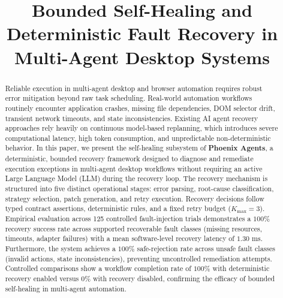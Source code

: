 \documentclass[conference]{IEEEtran}
\begin{document}
\title{Bounded Self-Healing and Deterministic Fault Recovery in Multi-Agent Desktop Systems}

\author{
}

\maketitle

\begin{abstract}
Reliable execution in multi-agent desktop and browser automation requires robust error mitigation beyond raw task scheduling. Real-world automation workflows routinely encounter application crashes, missing file dependencies, DOM selector drift, transient network timeouts, and state inconsistencies. Existing AI agent recovery approaches rely heavily on continuous model-based replanning, which introduces severe computational latency, high token consumption, and unpredictable non-deterministic behavior. In this paper, we present the self-healing subsystem of \textbf{Phoenix Agents}, a deterministic, bounded recovery framework designed to diagnose and remediate execution exceptions in multi-agent desktop workflows without requiring an active Large Language Model (LLM) during the recovery loop. The recovery mechanism is structured into five distinct operational stages: error parsing, root-cause classification, strategy selection, patch generation, and retry execution. Recovery decisions follow typed contract assertions, deterministic rules, and a fixed retry budget ($K_{\text{max}}=3$). Empirical evaluation across 125 controlled fault-injection trials demonstrates a $100\%$ recovery success rate across supported recoverable fault classes (missing resources, timeouts, adapter failures) with a mean software-level recovery latency of $1.30\text{ ms}$. Furthermore, the system achieves a $100\%$ safe-rejection rate across unsafe fault classes (invalid actions, state inconsistencies), preventing uncontrolled remediation attempts. Controlled comparisons show a workflow completion rate of $100\%$ with deterministic recovery enabled versus $0\%$ with recovery disabled, confirming the efficacy of bounded self-healing in multi-agent automation.
\end{abstract}
\end{document}
